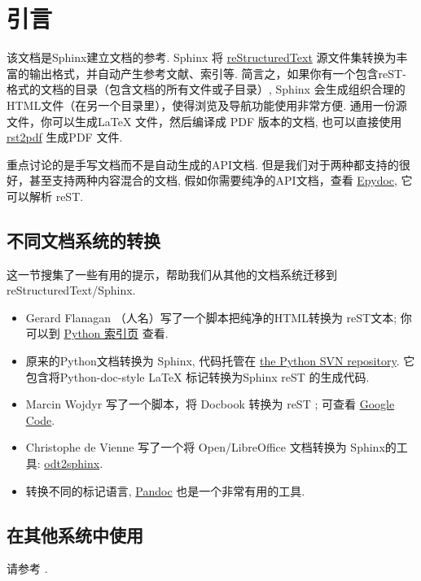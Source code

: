 \documentclass[letterpaper,10pt,english]{sphinxmanual}
\begin{document}
\chapter{引言}
\label{intro:id1}\label{intro::doc}
该文档是Sphinx建立文档的参考.  Sphinx 将 \href{http://docutils.sf.net/rst.html}{reStructuredText}  源文件集转换为丰富的输出格式，并自动产生参考文献、索引等.
简言之，如果你有一个包含reST-格式的文档的目录（包含文档的所有文件或子目录）,
Sphinx 会生成组织合理的HTML文件（在另一个目录里），使得浏览及导航功能使用非常方便.
通用一份源文件，你可以生成LaTeX 文件，然后编译成 PDF 版本的文档,
也可以直接使用 \href{http://rst2pdf.googlecode.com}{rst2pdf} 生成PDF 文件.

重点讨论的是手写文档而不是自动生成的API文档.
但是我们对于两种都支持的很好，甚至支持两种内容混合的文档,
假如你需要纯净的API文档，查看 \href{http://epydoc.sf.net/}{Epydoc}, 它可以解析 reST.


\section{不同文档系统的转换}
\label{intro:id2}
这一节搜集了一些有用的提示，帮助我们从其他的文档系统迁移到reStructuredText/Sphinx.
\begin{itemize}
\item {} 
Gerard Flanagan （人名）写了一个脚本把纯净的HTML转换为 reST文本;
你可以到 \href{http://pypi.python.org/pypi/html2rest}{Python 索引页} 查看.

\item {} 
原来的Python文档转换为 Sphinx,
代码托管在 \href{http://svn.python.org/projects/doctools/converter}{the Python SVN repository}.
它包含将Python-doc-style LaTeX 标记转换为Sphinx reST 的生成代码.

\item {} 
Marcin Wojdyr 写了一个脚本，将 Docbook 转换为 reST ; 可查看 \href{http://code.google.com/p/db2rst/}{Google Code}.

\item {} 
Christophe de Vienne 写了一个将 Open/LibreOffice 文档转换为
Sphinx的工具: \href{http://pypi.python.org/pypi/odt2sphinx/}{odt2sphinx}.

\item {} 
转换不同的标记语言, \href{http://johnmacfarlane.net/pandoc/}{Pandoc} 也是一个非常有用的工具.

\end{itemize}


\section{在其他系统中使用}
\label{intro:id3}
请参考 {\hyperref[faq:usingwith]{}}.
\end{document}
